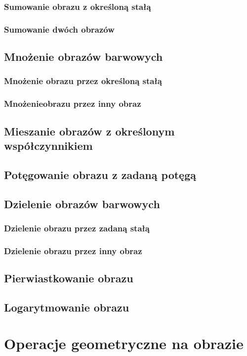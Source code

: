 \documentclass[a4paper,12pt, titlepage]{report}
\begin{document}
\subsection{Sumowanie obrazu z określoną stałą}
\subsection{Sumowanie dwóch obrazów}
\section{Mnożenie obrazów barwowych}
\subsection{Mnożenie obrazu przez określoną stałą}
\subsection{Mnożenieobrazu przez inny obraz}
\section{Mieszanie obrazów z określonym współczynnikiem}
\section{Potęgowanie obrazu z zadaną potęgą}
\section{Dzielenie obrazów barwowych}
\subsection{Dzielenie obrazu przez zadaną stałą}
\subsection{Dzielenie obrazu przez inny obraz}
\section{Pierwiastkowanie obrazu}
\section{Logarytmowanie obrazu}

\chapter{Operacje geometryczne na obrazie}
\end{document}
